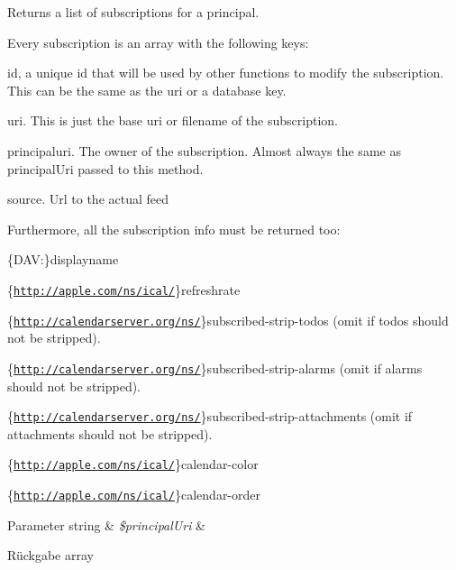 Returns a list of subscriptions for a principal.

Every subscription is an array with the following keys\+:
\begin{DoxyItemize}
\item id, a unique id that will be used by other functions to modify the subscription. This can be the same as the uri or a database key.
\item uri. This is just the \textquotesingle{}base uri\textquotesingle{} or \textquotesingle{}filename\textquotesingle{} of the subscription.
\item principaluri. The owner of the subscription. Almost always the same as principal\+Uri passed to this method.
\item source. Url to the actual feed
\end{DoxyItemize}

Furthermore, all the subscription info must be returned too\+:


\begin{DoxyEnumerate}
\item \{D\+AV\+:\}displayname
\item \{\href{http://apple.com/ns/ical/}{\tt http\+://apple.\+com/ns/ical/}\}refreshrate
\item \{\href{http://calendarserver.org/ns/}{\tt http\+://calendarserver.\+org/ns/}\}subscribed-\/strip-\/todos (omit if todos should not be stripped).
\item \{\href{http://calendarserver.org/ns/}{\tt http\+://calendarserver.\+org/ns/}\}subscribed-\/strip-\/alarms (omit if alarms should not be stripped).
\item \{\href{http://calendarserver.org/ns/}{\tt http\+://calendarserver.\+org/ns/}\}subscribed-\/strip-\/attachments (omit if attachments should not be stripped).
\item \{\href{http://apple.com/ns/ical/}{\tt http\+://apple.\+com/ns/ical/}\}calendar-\/color
\item \{\href{http://apple.com/ns/ical/}{\tt http\+://apple.\+com/ns/ical/}\}calendar-\/order
\end{DoxyEnumerate}


\begin{DoxyParams}[1]{Parameter}
string & {\em \$principal\+Uri} & \\
\hline
\end{DoxyParams}
\begin{DoxyReturn}{Rückgabe}
array 
\end{DoxyReturn}


